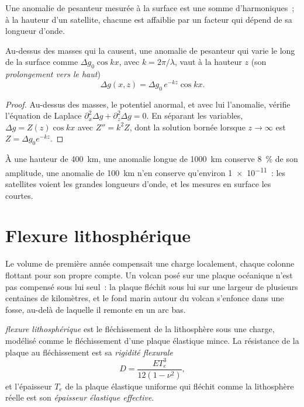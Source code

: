 Une anomalie de pesanteur mesurée à la surface est une somme d'harmoniques~; à
la hauteur d'un satellite, chacune est affaiblie par un facteur qui dépend de sa
longueur d'onde.

\begin{proposition}\label{prop:b3:gravity-geodesy:upward}
Au-dessus des masses qui la causent, une anomalie de pesanteur qui varie le long
de la surface comme $\Delta g_0\cos kx$, avec $k = 2\pi/\lambda$, vaut à la
hauteur $z$ (son \emph{prolongement vers le haut})
\[
  \Delta g(x, z) = \Delta g_0\,e^{-kz}\cos kx .
\]
\end{proposition}

\begin{proof}
Au-dessus des masses, le potentiel anormal, et avec lui l'anomalie, vérifie
l'équation de Laplace $\partial_x^2\Delta g + \partial_z^2\Delta g = 0$. En
séparant les variables, $\Delta g = Z(z)\cos kx$ avec $Z'' = k^2Z$, dont la
solution bornée lorsque $z \to \infty$ est $Z = \Delta g_0e^{-kz}$.
\end{proof}

À une hauteur de \qty{400}{km}, une anomalie longue de \qty{1000}{km} conserve \qty{8}{\percent}
de son amplitude, une anomalie de \qty{100}{km} n'en conserve qu'environ \num{1e-11}~:
les satellites voient les grandes longueurs d'onde, et les mesures en surface les courtes.

\section{Flexure lithosphérique}

Le volume de première année compensait une charge localement, chaque colonne flottant pour son propre compte.
Un volcan posé sur une plaque océanique n'est pas compensé sous lui seul~: la
plaque fléchit sous lui sur une largeur de plusieurs centaines de kilomètres, et le fond marin
autour du volcan s'enfonce dans une fosse, au-delà de laquelle il remonte en un arc bas.

\begin{definition}\label{def:b3:gravity-geodesy:flexure}
\emph{flexure lithosphérique} est le fléchissement de la
lithosphère sous une charge, modélisé comme le fléchissement d'une plaque élastique mince. La
résistance de la plaque au fléchissement est sa
\emph{rigidité flexurale}
\[
  D = \frac{ET_e^3}{12(1 - \nu^2)},
\]
et l'épaisseur $T_e$ de la plaque élastique uniforme qui fléchit comme la
lithosphère réelle est son \emph{épaisseur élastique effective}.
\end{definition}

